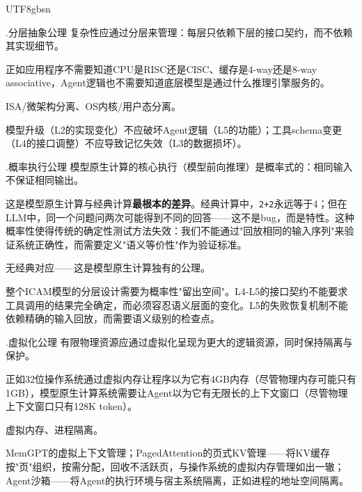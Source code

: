\documentclass[11pt,a4paper]{article}
\newcounter{axiom}[section]
\renewcommand{\theaxiom}{\thesection.\arabic{axiom}}
\begin{document}
\begin{CJK*}{UTF8}{gbsn}
\begin{axiombox}{\theaxiom\enspace 分层抽象公理}
复杂性应通过分层来管理：每层只依赖下层的接口契约，而不依赖其实现细节。
\end{axiombox}
\begin{description}[style=nextline,leftmargin=2em,font=\bfseries]
\item[直观解释] 正如应用程序不需要知道CPU是RISC还是CISC、缓存是4-way还是8-way associative，Agent逻辑也不需要知道底层模型是通过什么推理引擎服务的。
\item[经典来源] ISA/微架构分离、OS内核/用户态分离\cite{hennessy2017quantitative,ostep_2023}。
\item[ICAM体现] 模型升级（L2的实现变化）不应破坏Agent逻辑（L5的功能）；工具schema变更（L4的接口调整）不应导致记忆失效（L3的数据损坏）。
\end{description}

\begin{axiombox}{\theaxiom\enspace 概率执行公理}
模型原生计算的核心执行（模型前向推理）是概率式的：相同输入不保证相同输出。
\end{axiombox}
\begin{description}[style=nextline,leftmargin=2em,font=\bfseries]
\item[直观解释] 这是模型原生计算与经典计算\textbf{最根本的差异}。经典计算中，\texttt{2+2}永远等于4；但在LLM中，同一个问题问两次可能得到不同的回答——这不是bug，而是特性。这种概率性使得传统的确定性测试方法失效：我们不能通过"回放相同的输入序列"来验证系统正确性，而需要定义"语义等价性"作为验证标准。
\item[经典来源] 无经典对应——这是模型原生计算独有的公理。
\item[ICAM体现] 整个ICAM模型的分层设计需要为概率性"留出空间"。L4-L5的接口契约不能要求工具调用的结果完全确定，而必须容忍语义层面的变化。L5的失败恢复机制不能依赖精确的输入回放，而需要语义级别的检查点。
\end{description}

\begin{axiombox}{\theaxiom\enspace 虚拟化公理}
有限物理资源应通过虚拟化呈现为更大的逻辑资源，同时保持隔离与保护。
\end{axiombox}
\begin{description}[style=nextline,leftmargin=2em,font=\bfseries]
\item[直观解释] 正如32位操作系统通过虚拟内存让程序以为它有4GB内存（尽管物理内存可能只有1GB），模型原生计算系统需要让Agent以为它有无限长的上下文窗口（尽管物理上下文窗口只有128K token）。
\item[经典来源] 虚拟内存、进程隔离\cite{ostep_2023}。
\item[ICAM体现] MemGPT的虚拟上下文管理\cite{memgpt2023}；PagedAttention的页式KV管理\cite{kwon2023pagedattention}——将KV缓存按"页"组织，按需分配，回收不活跃页，与操作系统的虚拟内存管理如出一辙；Agent沙箱\cite{openai_codex_sandbox_2026}——将Agent的执行环境与宿主系统隔离，正如进程的地址空间隔离。
\end{description}


\end{CJK*}
\end{document}

